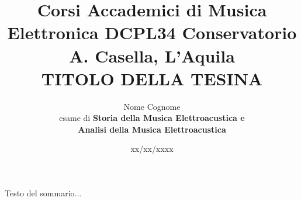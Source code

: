 \documentclass[a4paper,12pt]{article}
\title{Corsi Accademici di Musica Elettronica DCPL34 Conservatorio A. Casella, L'Aquila \\ \fontsize{14}{17}\bfseries\uppercase{Titolo della Tesina}}
\author{Nome Cognome \\ esame di \bfseries{Storia della Musica Elettroacustica} e \\ \bfseries{Analisi della Musica Elettroacustica}}
\date{xx/xx/xxxx}
\begin{document}
\maketitle
\thispagestyle{empty}

\begin{center}
    \vspace{1cm}
    \textbf{\fontsize{12}{15}\selectfont{Sommario}}
\end{center}

Testo del sommario...

\newpage
\tableofcontents  

\newpage



\newpage %


\end{document}
